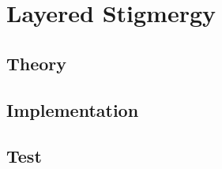 
\chapter{Layered Stigmergy}
\label{chap:lay_stig}


\section{Theory}

\section{Implementation}

\section{Test}
\label{chap:lay_stigmergy.sec:test}
